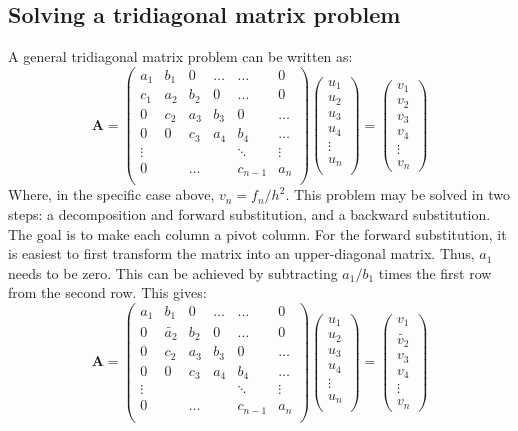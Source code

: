 \documentclass[a4paper, 10pt]{article}
\begin{document}
\subsection*{Solving a tridiagonal matrix problem}
A general tridiagonal matrix problem can be written as:
$$\mathbf{A}=\begin{pmatrix}
a_{1} & b_1 & 0 & \ldots &  \ldots & 0\\
c_1 & a_2 & b_2  & 0 & \ldots & 0\\
0 & c_2 & a_3 &b_3 & 0 & \ldots \\
0 & 0 & c_3 & a_4 &b_4 &\ldots\\
\vdots &  & &  &\ddots & \vdots \\
0 && \ldots && c_{n-1}&  a_n  \\
\end{pmatrix}\begin{pmatrix}
u_1\\
u_2\\
u_3\\
u_4\\
\vdots\\
u_n\\
\end{pmatrix}=\begin{pmatrix}
v_1\\
v_2\\
v_3\\
v_4\\
\vdots\\
v_n
\end{pmatrix}$$
Where, in the specific case above, $v_n=f_n/h^2$. This problem may be solved in two steps: a decomposition and forward substitution, and a backward substitution. The goal is to make each column a pivot column. For the forward substitution, it is easiest to first transform the matrix into an upper-diagonal matrix. Thus, $a_1$ needs to be zero. This can be achieved by subtracting $a_1/b_1$ times the first row from the second row. This gives:
$$\mathbf{A}=\begin{pmatrix}
a_{1} & b_1 & 0 & \ldots &  \ldots & 0\\
0 & \tilde{a_2} & b_2  & 0 & \ldots & 0\\
0 & c_2 & a_3 &b_3 & 0 & \ldots \\
0 & 0 & c_3 & a_4 &b_4 &\ldots\\
\vdots &  & &  &\ddots & \vdots \\
0 && \ldots && c_{n-1}&  a_n  \\
\end{pmatrix}\begin{pmatrix}
u_1\\
u_2\\
u_3\\
u_4\\
\vdots\\
u_n\\
\end{pmatrix}=\begin{pmatrix}
v_1\\
\tilde{v_2}\\
v_3\\
v_4\\
\vdots\\
v_n
\end{pmatrix}$$
\end{document}
